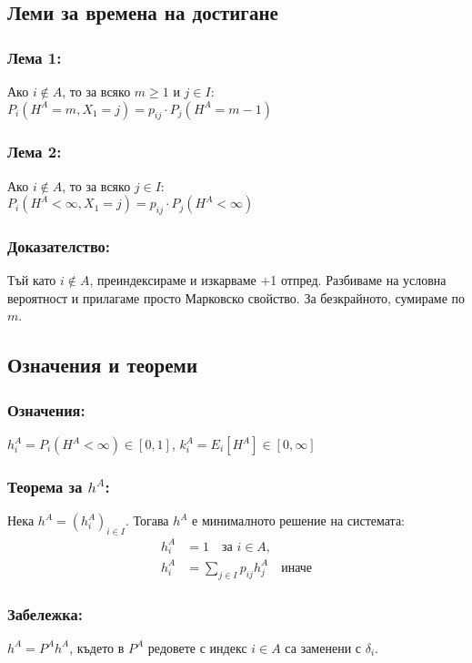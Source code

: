 \documentclass{article}
\begin{document}
\subsection{Леми за времена на достигане}
\subsubsection*{Лема 1:}
Ако $i \notin A$, то за всяко $m \geq 1$ и $j \in I$: \\
$P_i(H^A = m, X_1 = j) = p_{ij} \cdot P_j(H^A = m-1)$

\subsubsection*{Лема 2:}
Ако $i \notin A$, то за всяко $j \in I$: \\
$P_i(H^A < \infty, X_1 = j) = p_{ij} \cdot P_j(H^A < \infty)$

\subsubsection*{Доказателство:}
Тъй като $i \notin A$, преиндексираме и изкарваме +1 отпред. Разбиваме на условна вероятност и прилагаме просто Марковско свойство. За безкрайното, сумираме по $m$.

\subsection{Означения и теореми}
\subsubsection*{Означения:}
$h_i^A = P_i(H^A < \infty) \in [0, 1]$, \quad $k_i^A = E_i[H^A] \in [0, \infty]$

\subsubsection*{Теорема за $h^A$:}
Нека $h^A = (h_i^A)_{i \in I}$. Тогава $h^A$ е минималното решение на системата:
\begin{align*}
h_i^A &= 1 \quad \text{за } i \in A, \\
h_i^A &= \sum_{j \in I} p_{ij} h_j^A \quad \text{иначе}
\end{align*}

\subsubsection*{Забележка:}
$h^A = P^A h^A$, където в $P^A$ редовете с индекс $i \in A$ са заменени с $\delta_i$.
\end{document}
